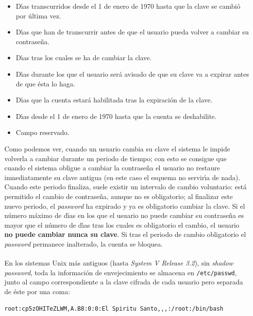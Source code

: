 \begin{itemize}
\item D\'{\i}as transcurridos desde el 1 de enero de 1970 hasta que la clave se 
cambi\'o por \'ultima vez.
\item D\'{\i}as que han de transcurrir antes de que el usuario pueda volver a
cambiar su contrase\~na.
\item D\'{\i}as tras los cuales se ha de cambiar la clave.
\item D\'{\i}as durante los que el usuario ser\'a avisado de que su clave va
a expirar antes de que \'esta lo haga.
\item D\'{\i}as que la cuenta estar\'a habilitada tras la expiraci\'on de la
clave.
\item D\'{\i}as desde el 1 de enero de 1970 hasta que la cuenta se deshabilite.
\item Campo reservado.
\end{itemize}
Como podemos ver, cuando un usuario cambia su clave el sistema le impide 
volverla a cambiar durante un periodo de tiempo; con esto se consigue que 
cuando el sistema obligue a cambiar la contrase\~na el usuario no restaure 
inmediatamente su clave antigua (en este caso el esquema no servir\'{\i}a de
nada). Cuando este periodo finaliza, suele existir un intervalo de cambio 
voluntario: est\'a permitido el cambio de contrase\~na, aunque no es 
obligatorio; al finalizar este nuevo periodo, el {\it password} ha expirado y ya
es obligatorio cambiar la clave. Si el n\'umero m\'aximo de d\'{\i}as en los
que el usuario no puede cambiar su contrase\~na es mayor que el n\'umero de 
d\'{\i}as tras los cuales es obligatorio el cambio, el usuario {\bf no puede
cambiar nunca su clave}. Si tras el periodo de cambio obligatorio el {\it
password} permanece inalterado, la cuenta se bloquea.\\
\\En los sistemas Unix m\'as antiguos (hasta {\it System V Release 3.2}), sin 
{\it shadow password}, toda la informaci\'on de envejecimiento se almacena en 
{\tt /etc/passwd}, junto al campo correspondiente a la clave cifrada de cada 
usuario pero separada de \'este por una coma:
\begin{center}
{\tt root:cp5zOHITeZLWM,A.B8:0:0:El Spiritu Santo,,,:/root:/bin/bash}
\end{center}

